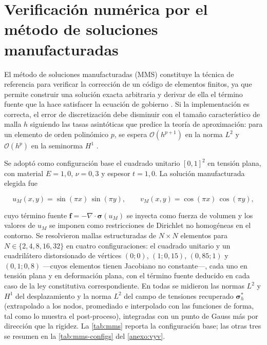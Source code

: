 \section{Verificación numérica por el método de soluciones manufacturadas}

El método de soluciones manufacturadas (MMS) constituye la técnica de referencia para verificar la corrección de un código de elementos finitos, ya que permite construir una solución exacta arbitraria y derivar de ella el término fuente que la hace satisfacer la ecuación de gobierno \autocites[pp.~219-222]{oberkampf2010vv}[pp.~20-21]{salari2000mms}. Si la implementación es correcta, el error de discretización debe disminuir con el tamaño característico de malla $h$ siguiendo las tasas asintóticas que predice la teoría de aproximación: para un elemento de orden polinómico $p$, se espera $\mathcal{O}(h^{p+1})$ en la norma $L^2$ y $\mathcal{O}(h^{p})$ en la seminorma $H^1$ \autocites[pp.~106-107]{strang2008analysis}[pp.~189-190]{hughes2000fem}[p.~38]{zienkiewicz2013fem}.

Se adoptó como configuración base el cuadrado unitario $[0,1]^2$ en tensión plana, con material $E = 1{,}0$, $\nu = 0{,}3$ y espesor $t = 1{,}0$. La solución manufacturada elegida fue

\begin{equation}
u_M(x,y) = \sin(\pi x)\,\sin(\pi y), \qquad v_M(x,y) = \cos(\pi x)\,\cos(\pi y),
\label{eq:mms-solucion}
\end{equation}

cuyo término fuente $\bm{f} = -\nabla\cdot\bm{\sigma}(u_M)$ se inyecta como fuerza de volumen y los valores de $u_M$ se imponen como restricciones de Dirichlet no homogéneas en el contorno. Se resolvieron mallas estructuradas de $N\times N$ elementos para $N\in\{2,4,8,16,32\}$ en cuatro configuraciones: el cuadrado unitario y un cuadrilátero distorsionado de vértices $(0;0)$, $(1;0{,}15)$, $(0{,}85;1)$ y $(0{,}1;0{,}8)$ —cuyos elementos tienen Jacobiano no constante—, cada uno en tensión plana y en deformación plana, con el término fuente deducido en cada caso de la ley constitutiva correspondiente. En todas se midieron las normas $L^2$ y $H^1$ del desplazamiento y la norma $L^2$ del campo de tensiones recuperado $\bm{\sigma}^*_h$ (extrapolado a los nodos, promediado e interpolado con las funciones de forma, tal como lo muestra el post-proceso), integradas con un punto de Gauss más por dirección que la rigidez. La \autoref{tab:mms} reporta la configuración base; las otras tres se resumen en la \autoref{tab:mms-configs} del \autoref{anexo:vyv}.

